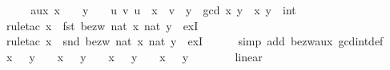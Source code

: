 \begin{isabellebody}
\ {\isacharminus}{\kern0pt}\isanewline
\ \ \isamarkupfalse%
\ aux{\isacharcolon}{\kern0pt}\ {\isachardoublequoteopen}x\ {\isasymge}\ {}\ {\isasymLongrightarrow}\ y\ {\isasymge}\ {}\ {\isasymLongrightarrow}\ {\isasymexists}u\ v{\isachardot}{\kern0pt}\ u\ {\isacharasterisk}{\kern0pt}\ x\ {\isacharplus}{\kern0pt}\ v\ {\isacharasterisk}{\kern0pt}\ y\ {\isacharequal}{\kern0pt}\ gcd\ x\ y{\isachardoublequoteclose}\ \ x\ y\ {\isacharcolon}{\kern0pt}{\isacharcolon}{\kern0pt}\ int\isanewline
\ \ \ \ \isamarkupfalse%
\ {\isacharparenleft}{\kern0pt}rule{\isacharunderscore}{\kern0pt}tac\ x\ {\isacharequal}{\kern0pt}\ {\isachardoublequoteopen}fst\ {\isacharparenleft}{\kern0pt}bezw\ {\isacharparenleft}{\kern0pt}nat\ x{\isacharparenright}{\kern0pt}\ {\isacharparenleft}{\kern0pt}nat\ y{\isacharparenright}{\kern0pt}{\isacharparenright}{\kern0pt}{\isachardoublequoteclose}\ \ exI{\isacharparenright}{\kern0pt}\isanewline
\ \ \ \ \isamarkupfalse%
\ {\isacharparenleft}{\kern0pt}rule{\isacharunderscore}{\kern0pt}tac\ x\ {\isacharequal}{\kern0pt}\ {\isachardoublequoteopen}snd\ {\isacharparenleft}{\kern0pt}bezw\ {\isacharparenleft}{\kern0pt}nat\ x{\isacharparenright}{\kern0pt}\ {\isacharparenleft}{\kern0pt}nat\ y{\isacharparenright}{\kern0pt}{\isacharparenright}{\kern0pt}{\isachardoublequoteclose}\ \ exI{\isacharparenright}{\kern0pt}\isanewline
\ \ \ \ \isamarkupfalse%
\ {\isacharparenleft}{\kern0pt}simp\ add{\isacharcolon}{\kern0pt}\ bezw{\isacharunderscore}{\kern0pt}aux\ gcd{\isacharunderscore}{\kern0pt}int{\isacharunderscore}{\kern0pt}def{\isacharparenright}{\kern0pt}\isanewline
\ \ \isamarkupfalse%
\ {\isachardoublequoteopen}x\ {\isasymge}\ {}{\isachardoublequoteclose}\ {\isachardoublequoteopen}y\ {\isasymge}\ {}{\isachardoublequoteclose}\ {\isacharbar}{\kern0pt}\ {\isachardoublequoteopen}x\ {\isasymge}\ {}{\isachardoublequoteclose}\ {\isachardoublequoteopen}y\ {\isasymle}\ {}{\isachardoublequoteclose}\ {\isacharbar}{\kern0pt}\ {\isachardoublequoteopen}x\ {\isasymle}\ {}{\isachardoublequoteclose}\ {\isachardoublequoteopen}y\ {\isasymge}\ {}{\isachardoublequoteclose}\ {\isacharbar}{\kern0pt}\ {\isachardoublequoteopen}x\ {\isasymle}\ {}{\isachardoublequoteclose}\ {\isachardoublequoteopen}y\ {\isasymle}\ {}{\isachardoublequoteclose}\isanewline
\ \ \ \ \isamarkupfalse%
\ linear\ \isamarkupfalse%

\end{isabellebody}
